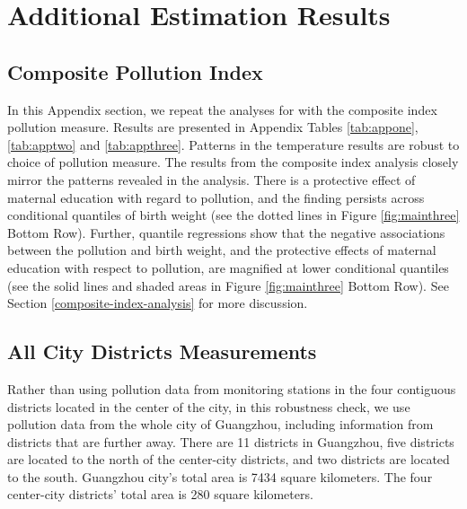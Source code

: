\renewcommand{\thefigure}{A.\arabic{figure}}
\setcounter{figure}{0}
\renewcommand{\thetable}{A.\arabic{table}}
\setcounter{table}{0}
\renewcommand{\theequation}{A.\arabic{equation}}
\setcounter{equation}{0}
\renewcommand{\thefootnote}{A.\arabic{footnote}}
\setcounter{footnote}{0}

\section{Additional Estimation Results}

\subsection{Composite Pollution Index}
In this Appendix section, we repeat the analyses for \PARPMTEN with the composite index pollution
measure. Results are presented in Appendix Tables \ref{tab:appone}, \ref{tab:apptwo} and \ref{tab:appthree}. Patterns
in the temperature results are robust to choice of pollution measure. The results from the composite index
analysis closely mirror the patterns revealed in the \PARPMTEN analysis.
There is a protective effect of maternal education with regard to
pollution, and the finding persists across conditional quantiles of
birth weight (see the dotted lines in Figure \ref{fig:mainthree} Bottom Row). Further, quantile
regressions show that the negative associations between the pollution
and birth weight, and the protective effects of maternal education with
respect to pollution, are magnified at lower conditional quantiles (see
the solid lines and shaded areas in Figure \ref{fig:mainthree} Bottom Row). See Section \ref{composite-index-analysis} for more discussion.


\pagebreak 

\pagebreak 

\clearpage

\subsection{All City Districts \PARPMTEN Measurements\label{sec:appallcity}}

Rather than using pollution data from monitoring stations in the four contiguous districts located in the center of the city, in this robustness check, we use pollution data from the whole city of Guangzhou, including information from districts that are further away. There are 11 districts in Guangzhou, five districts are located to the north of the center-city districts, and two districts are located to the south. Guangzhou city's total area is 7434 square kilometers. The four center-city districts' total area is 280 square kilometers. 

